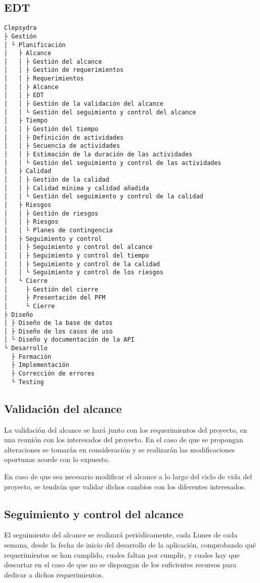 \subsection{EDT}
\begin{verbatim}
Clepsydra
├ Gestión
│ └ Planificación
│   ├ Alcance
│   │ ├ Gestión del alcance
│   │ ├ Gestión de requerimientos
│   │ ├ Requerimientos
│   │ ├ Alcance
│   │ ├ EDT
│   │ ├ Gestión de la validación del alcance
│   │ └ Gestión del seguimiento y control del alcance
│   ├ Tiempo
│   │ ├ Gestión del tiempo
│   │ ├ Definición de actividades
│   │ ├ Secuencia de actividades
│   │ ├ Estimación de la duración de las actividades
│   │ └ Gestión del seguimiento y control de las actividades
│   ├ Calidad
│   │ ├ Gestión de la calidad
│   │ ├ Calidad mínima y calidad añadida
│   │ └ Gestión del seguimiento y control de la calidad
│   ├ Riesgos
│   │ ├ Gestión de riesgos
│   │ ├ Riesgos
│   │ └ Planes de contingencia
│   ├ Seguimiento y control
│   │ ├ Seguimiento y control del alcance
│   │ ├ Seguimiento y control del tiempo
│   │ ├ Seguimiento y control de la calidad
│   │ └ Seguimiento y control de los riesgos
│   └ Cierre
│     ├ Gestión del cierre
│     ├ Presentación del PFM
│     └ Cierre
├ Diseño
│ ├ Diseño de la base de datos
│ ├ Diseño de los casos de uso
│ └ Diseño y documentación de la API
└ Desarrollo
  ├ Formación
  ├ Implementación
  ├ Corrección de errores
  └ Testing
\end{verbatim}

\subsection{Validación del alcance}
La validación del alcance se hará junto con los requerimientos del proyecto,
en una reunión con los interesados del proyecto. En el caso de que se propongan
alteraciones se tomarán en consideración y se realizarán las modificaciones
oportunas acorde con lo expuesto.

En caso de que sea necesario modificar el alcance a lo largo del ciclo de
vida del proyecto, se tendrán que validar dichos cambios con los diferentes
interesados.

\subsection{Seguimiento y control del alcance}
El seguimiento del alcance se realizará periódicamente, cada Lunes de cada
semana, desde la fecha de inicio del desarrollo de la aplicación, comprobando
qué requerimientos se han cumplido, cuales faltan por cumplir, y cuales hay
que descartar en el caso de que no se dispongan de los suficientes recursos
para dedicar a dichos requerimientos.
